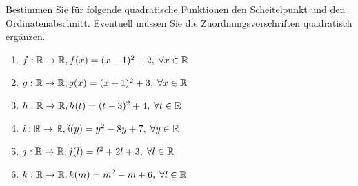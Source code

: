 \documentclass[12pt]{article}
\begin{document}
\begin{exercise}\label{ex:scheitelpunkt_und_ordinatenabschnitt}
Bestimmen Sie für folgende quadratische Funktionen den Scheitelpunkt und den Ordinatenabschnitt. Eventuell müssen Sie die Zuordnungsvorschriften quadratisch ergänzen.
\begin{enumerate}[label=\alph*)]
\item $f: \mathbb{R} \rightarrow \mathbb{R}, f(x) = (x-1)^2 + 2, \; \forall x \in \mathbb{R}$
\item $g: \mathbb{R} \rightarrow \mathbb{R}, g(x) = (x+1)^2 + 3, \; \forall x \in \mathbb{R}$
\item $h: \mathbb{R} \rightarrow \mathbb{R}, h(t) = (t-3)^2 + 4, \; \forall t \in \mathbb{R}$
\item $i: \mathbb{R} \rightarrow \mathbb{R}, i(y) = y^2 - 8y + 7, \; \forall y \in \mathbb{R}$
\item $j: \mathbb{R} \rightarrow \mathbb{R}, j(l) = l^2 + 2l + 3, \; \forall l \in \mathbb{R}$
\item $k: \mathbb{R} \rightarrow \mathbb{R}, k(m) = m^2 - m + 6, \; \forall l \in \mathbb{R}$
\end{enumerate} 
\end{exercise}
\end{document}
